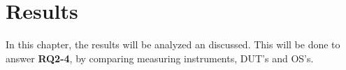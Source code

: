 \chapter{Results}\label{ch:results}

In this chapter, the results will be analyzed an discussed. This will be done to answer \textbf{RQ2-4}, by comparing measuring instruments, DUT's and OS's.






